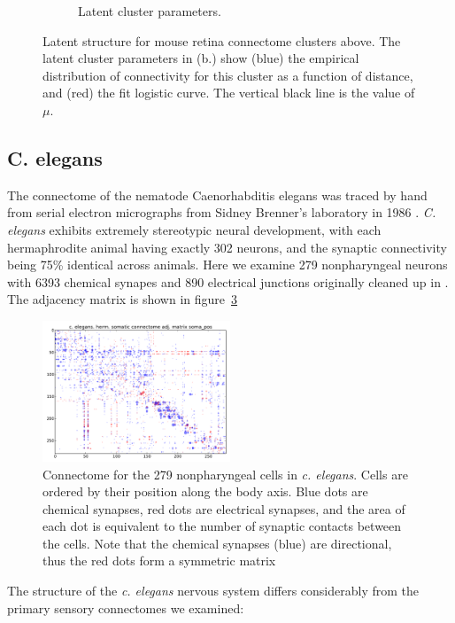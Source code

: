 \documentclass{article}
\begin{document}
\begin{figure}
\begin{subfigure}[b]{0.46\textwidth}
    \caption{Latent cluster parameters. }
    \label{fig:gull}
  \end{subfigure}
  \caption{Latent structure for mouse retina connectome clusters above. The latent cluster parameters in (b.) show (blue) the empirical distribution of connectivity for this cluster as a function of distance, and (red) the fit logistic curve. The vertical black line is the value of $\mu$.}
  \label{fig:mouseretina:latent}
\end{figure}

\subsection{C. elegans}

The connectome of the nematode Caenorhabditis elegans was traced by
hand from serial electron micrographs from Sidney Brenner's laboratory
in 1986 \autocite{White1986}. \textit{C. elegans} exhibits extremely
stereotypic neural development, with each hermaphrodite animal having
exactly 302 neurons, and the synaptic connectivity being 75\%
identical  across animals. Here we
examine 279 nonpharyngeal neurons with 6393 chemical synapes and 890 electrical junctions originally cleaned up in \autocite{Chen2006}. The adjacency matrix is shown in figure~\ref{fig:celegans:adj}  

\begin{figure}
  \centering 
  \includegraphics[width=0.5\textwidth]{celegans/data.pos.pdf}
  \caption{Connectome for the 279 nonpharyngeal cells in \textit{c. elegans}. Cells are ordered by their position along the body axis. Blue dots are chemical synapses, red dots are electrical synapses, and the area of each dot is equivalent to the number of synaptic contacts between the cells. Note that the chemical synapses (blue) are directional, thus the red dots form a symmetric matrix}
  \label{fig:celegans:adj}
\end{figure}


The structure of the \textit{c. elegans} nervous system differs considerably 
from the primary sensory connectomes we examined: 
\end{document}
